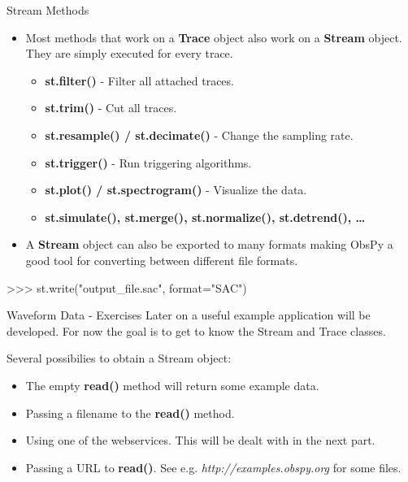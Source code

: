 \documentclass[handout]{beamer}
\begin{document}
\begin{frame}{Stream Methods}

 \begin{itemize}
     \item Most methods that work on a \textbf{Trace} object also work on a \textbf{Stream} object. They are simply executed for every trace.
         \begin{itemize}
             \item \textbf{st.filter()} - Filter all attached traces.
             \item \textbf{st.trim()} - Cut all traces.
             \item \textbf{st.resample() / st.decimate()} - Change the sampling rate.
             \item \textbf{st.trigger()} - Run triggering algorithms.
             \item \textbf{st.plot() / st.spectrogram()} - Visualize the data.
             \item \textbf{st.simulate(), st.merge(), st.normalize(), st.detrend(), \dots}
         \end{itemize}
     \item A \textbf{Stream} object can also be exported to many formats making ObsPy a good tool for converting between different file formats.

\end{itemize}
\begin{myColorBox}{0.95}{}
\begin{python}
>>> st.write("output_file.sac", format="SAC")
\end{python}
\end{myColorBox}

\end{frame}

\begin{frame}{Waveform Data - Exercises}
    Later on a useful example application will be developed. For now the goal is to get to know the Stream and Trace classes.

    \vspace{2ex}

    Several possibilies to obtain a Stream object:
    \begin{itemize}
        \item The empty \textbf{read()} method will return some example data.
        \item Passing a filename to the \textbf{read()} method.
        \item Using one of the webservices. This will be dealt with in the next part.
        \item Passing a URL to \textbf{read()}. See e.g. \textit{http://examples.obspy.org} for some files.
    \end{itemize}

    \vspace{2ex}

\end{frame}
\end{document}
